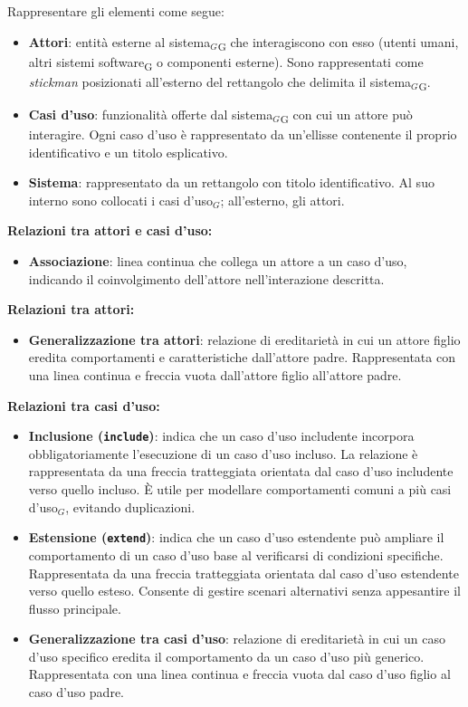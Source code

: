 \documentclass[a4paper, 10pt]{article}
\begin{document}
\noindent Rappresentare gli elementi come segue:
\begin{itemize}
    \item \textbf{Attori}: entità esterne al sistema$_G$\textsubscript{G} che interagiscono con esso (utenti umani, altri sistemi software\textsubscript{G} o componenti esterne). Sono rappresentati come \textit{stickman} posizionati all'esterno del rettangolo che delimita il sistema$_G$\textsubscript{G}.
    \item \textbf{Casi d'uso}: funzionalità offerte dal sistema$_G$\textsubscript{G} con cui un attore può interagire. Ogni caso d'uso è rappresentato da un'ellisse contenente il proprio identificativo e un titolo esplicativo.
    \item \textbf{Sistema}: rappresentato da un rettangolo con titolo identificativo. Al suo interno sono collocati i casi d'uso$_G$; all'esterno, gli attori.
\end{itemize}
\textbf{Relazioni tra attori e casi d'uso:}
\begin{itemize}
    \item \textbf{Associazione}: linea continua che collega un attore a un caso d'uso, indicando il coinvolgimento dell'attore nell'interazione descritta.
\end{itemize}
\textbf{Relazioni tra attori:}
\begin{itemize}
    \item \textbf{Generalizzazione tra attori}: relazione di ereditarietà in cui un attore figlio eredita comportamenti e caratteristiche dall'attore padre. Rappresentata con una linea continua e freccia vuota dall'attore figlio all'attore padre.
\end{itemize}
\textbf{Relazioni tra casi d'uso:}
\begin{itemize}
    \item \textbf{Inclusione (\texttt{\guillemotleft include\guillemotright})}: indica che un caso d'uso includente incorpora obbligatoriamente l'esecuzione di un caso d'uso incluso. La relazione è rappresentata da una freccia tratteggiata orientata dal caso d'uso includente verso quello incluso. È utile per modellare comportamenti comuni a più casi d'uso$_G$, evitando duplicazioni.
    \item \textbf{Estensione (\texttt{\guillemotleft extend\guillemotright})}: indica che un caso d'uso estendente può ampliare il comportamento di un caso d'uso base al verificarsi di condizioni specifiche. Rappresentata da una freccia tratteggiata orientata dal caso d'uso estendente verso quello esteso. Consente di gestire scenari alternativi senza appesantire il flusso principale.
    \item \textbf{Generalizzazione tra casi d'uso}: relazione di ereditarietà in cui un caso d'uso specifico eredita il comportamento da un caso d'uso più generico. Rappresentata con una linea continua e freccia vuota dal caso d'uso figlio al caso d'uso padre.
\end{itemize}
\end{document}
